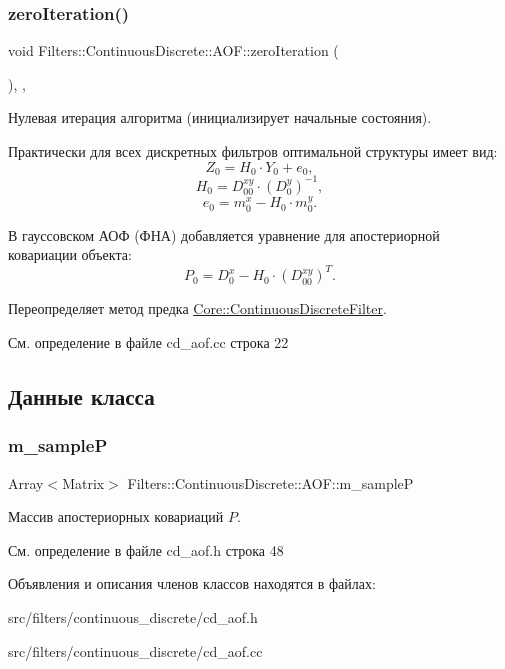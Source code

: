 \subsubsection{\texorpdfstring{zero\+Iteration()}{zeroIteration()}}
{\footnotesize\ttfamily void Filters\+::\+Continuous\+Discrete\+::\+A\+O\+F\+::zero\+Iteration (\begin{DoxyParamCaption}{ }\end{DoxyParamCaption})\hspace{0.3cm}{\ttfamily [override]}, {\ttfamily [protected]}, {\ttfamily [virtual]}}



Нулевая итерация алгоритма (инициализирует начальные состояния). 

Практически для всех дискретных фильтров оптимальной структуры имеет вид\+: \[Z_0 = H_0 \cdot Y_0 + e_0,\] \[H_0 = D_{00}^{xy} \cdot (D_0^y)^{-1},\] \[e_0 = m_0^x - H_0 \cdot m_0^y.\]

В гауссовском АОФ (ФНА) добавляется уравнение для апостериорной ковариации объекта\+: \[P_0 = D_0^x - H_0 \cdot (D_{00}^{xy})^T.\] 

Переопределяет метод предка \hyperlink{class_core_1_1_continuous_discrete_filter_acc9b18241a13d46dc92ef1f02ec13e53}{Core\+::\+Continuous\+Discrete\+Filter}.



См. определение в файле cd\+\_\+aof.\+cc строка 22



\subsection{Данные класса}
\hypertarget{class_filters_1_1_continuous_discrete_1_1_a_o_f_a31111852e94dab62675d8692a4c22df1}{}\label{class_filters_1_1_continuous_discrete_1_1_a_o_f_a31111852e94dab62675d8692a4c22df1} 
\subsubsection{\texorpdfstring{m\+\_\+sampleP}{m\_sampleP}}
{\footnotesize\ttfamily Array$<$Matrix$>$ Filters\+::\+Continuous\+Discrete\+::\+A\+O\+F\+::m\+\_\+sampleP\hspace{0.3cm}{\ttfamily [protected]}}

Массив апостериорных ковариаций $P$. 

См. определение в файле cd\+\_\+aof.\+h строка 48



Объявления и описания членов классов находятся в файлах\+:\begin{DoxyCompactItemize}
\item 
src/filters/continuous\+\_\+discrete/cd\+\_\+aof.\+h\item 
src/filters/continuous\+\_\+discrete/cd\+\_\+aof.\+cc\end{DoxyCompactItemize}
